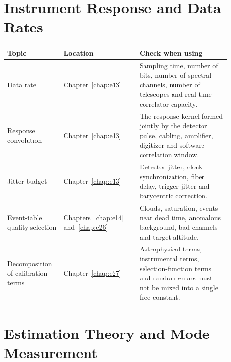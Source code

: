 \section{Instrument Response and Data Rates}
\label{appsec:a-instrument}

\begin{longtable}{p{0.22\linewidth}p{0.31\linewidth}p{0.37\linewidth}}
\toprule
Topic & Location & Check when using \\
\midrule
Data rate & Chapter~\ref{chap:e13} & Sampling time, number of bits, number of spectral channels, number of telescopes and real-time correlator capacity. \\
Response convolution & Chapter~\ref{chap:e13} & The response kernel formed jointly by the detector pulse, cabling, amplifier, digitizer and software correlation window. \\
Jitter budget & Chapter~\ref{chap:e13} & Detector jitter, clock synchronization, fiber delay, trigger jitter and barycentric correction. \\
Event-table quality selection & Chapters~\ref{chap:e14} and~\ref{chap:e26} & Clouds, saturation, events near dead time, anomalous background, bad channels and target altitude. \\
Decomposition of calibration terms & Chapter~\ref{chap:e27} & Astrophysical terms, instrumental terms, selection-function terms and random errors must not be mixed into a single free constant. \\
\bottomrule
\end{longtable}

\section{Estimation Theory and Mode Measurement}
\label{appsec:a-estimation}

